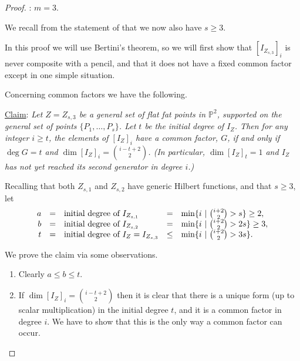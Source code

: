 \documentclass[12pt]{amsart}%
\numberwithin{equation}{section}
\theoremstyle{definition}
\numberwithin{equation}{section}
\begin{document}
\begin{proof}
\vspace{.2in}

: $m=3$.

We recall from the statement of  that we now also have $s \geq 3$.

In this proof we will use Bertini's theorem, so we will first show that $[I_{Z_{s,3}}]_i$ is never composite with a pencil, and that it does not have a fixed common factor except in one simple situation. 


Concerning common factors we have the following.

\vspace{.1in}

\noindent \underline{Claim}: 
    {\it Let $Z = Z_{s,3}$  be a general set of flat fat points in $\mathbb P^2$, supported on the general set of points $\{ P_1,\dots,P_s \}$. Let $t$ be the initial degree of $I_Z$. Then for any integer $i \geq t$,  the elements of $[I_Z]_i$ have a common factor, $G$, if and only if $\deg G = t$ and  $\dim [I_Z]_i = \binom{i-t+2}{2}$. (In particular, $\dim [I_Z]_t = 1$ and $I_Z$ has not yet reached its second generator in degree $i$.)}

\vspace{.1in}






Recalling that both $Z_{s,1}$ and $Z_{s,2}$ have generic Hilbert functions, and that $s \geq 3$, let
\[
\begin{array}{rclllll}
a & = & \hbox{initial degree of $I_{Z_{s,1}}$} & = & \min \{ i \ | \ \binom{i+2}{2} > s \} \geq 2, \\

b & = & \hbox{initial degree of $I_{Z_{s,2}}$} & = & \min \{ i \ | \ \binom{i+2}{2} > 2s \} \geq 3, \\

t & = & \hbox{initial degree of $I_Z = I_{Z_{s,3}}$} & \leq & \min \{ i \ | \ \binom{i+2}{2} > 3s \} .

\end{array}
\]

We prove the claim via some observations.

\begin{enumerate}

\item Clearly $a \leq b \leq t$.

\item \label{unique} If $\dim [I_Z]_i = \binom{i-t+2}{2}$ then it is clear that there is a unique form (up to scalar multiplication) in the initial degree $t$, and it is a common factor in degree $i$. We have to show that this is the only way a common factor can occur.


\end{enumerate}
\end{proof}
\end{document}
